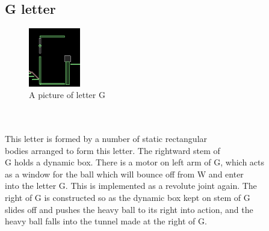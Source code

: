 \subsection{G letter}
\begin{figure}
	\caption{A picture of letter G}
	\centering
	 \includegraphics[width=0.2\textwidth]{./doc/G.png}%
\end{figure}
\begin{frame}
\centering
\\
\\
This letter is formed by a number of static rectangular \\bodies arranged to form this letter. The rightward stem of\\ G holds a dynamic box. There is a motor on left arm of G, which acts \\as a window for the ball which will bounce off from W and enter\\ into the letter G. This is implemented as a revolute joint again. The \\right of G is constructed so as the dynamic box kept on stem of G \\slides off and pushes the heavy ball to its right into action, and the \\heavy ball falls into the tunnel made at the right of G.
\end{frame}
\\
\\




\newpage

